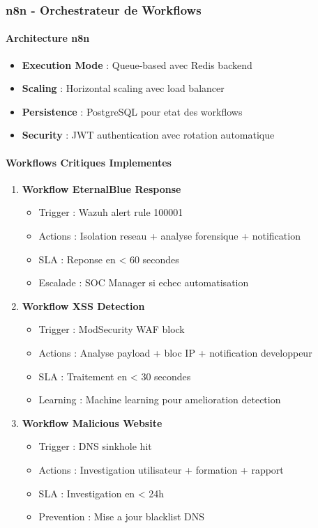 \subsubsection{n8n - Orchestrateur de Workflows}

\paragraph{Architecture n8n}
\begin{itemize}
    \item \textbf{Execution Mode} : Queue-based avec Redis backend
    \item \textbf{Scaling} : Horizontal scaling avec load balancer
    \item \textbf{Persistence} : PostgreSQL pour etat des workflows
    \item \textbf{Security} : JWT authentication avec rotation automatique
\end{itemize}

\paragraph{Workflows Critiques Implementes}

\begin{enumerate}
    \item \textbf{Workflow EternalBlue Response}
          \begin{itemize}
              \item Trigger : Wazuh alert rule 100001
              \item Actions : Isolation reseau + analyse forensique + notification
              \item SLA : Reponse en < 60 secondes
              \item Escalade : SOC Manager si echec automatisation
          \end{itemize}

    \item \textbf{Workflow XSS Detection}
          \begin{itemize}
              \item Trigger : ModSecurity WAF block
              \item Actions : Analyse payload + bloc IP + notification developpeur
              \item SLA : Traitement en < 30 secondes
              \item Learning : Machine learning pour amelioration detection
          \end{itemize}

    \item \textbf{Workflow Malicious Website}
          \begin{itemize}
              \item Trigger : DNS sinkhole hit
              \item Actions : Investigation utilisateur + formation + rapport
              \item SLA : Investigation en < 24h
              \item Prevention : Mise a jour blacklist DNS
          \end{itemize}
\end{enumerate}

